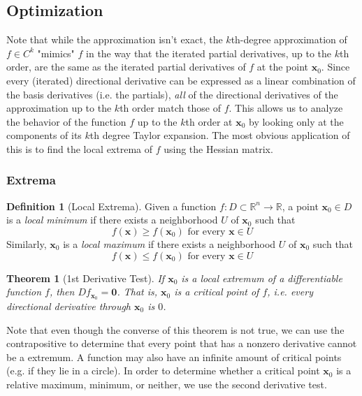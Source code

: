 \documentclass{article}
\newtheorem{theorem}{Theorem}[section]
\theoremstyle{remark}
\theoremstyle{definition}
\newtheorem{definition}{Definition}[section]
\begin{document}
\subsection{Optimization}

Note that while the approximation isn't exact, the $k$th-degree approximation of $f \in C^k$ "mimics" $f$ in the way that the iterated partial derivatives, up to the $k$th order, are the same as the iterated partial derivatives of $f$ at the point $\mathbf{x}_0$. Since every (iterated) directional derivative can be expressed as a linear combination of the basis derivatives (i.e. the partials), \textit{all} of the directional derivatives of the approximation up to the $k$th order match those of $f$. This allows us to analyze the behavior of the function $f$ up to the $k$th order at $\mathbf{x}_0$ by looking only at the components of its $k$th degree Taylor expansion. The most obvious application of this is to find the local extrema of $f$ using the Hessian matrix. 

\subsubsection{Extrema}

\begin{definition}[Local Extrema]
Given a function $f: D \subset \mathbb{R}^n \longrightarrow \mathbb{R}$, a point $\mathbf{x}_0 \in D$ is a \textit{local minimum} if there exists a neighborhood $U$ of $\mathbf{x}_0$ such that 
\[f(\mathbf{x}) \geq f(\mathbf{x}_0) \text{ for every } \mathbf{x} \in U\]
Similarly, $\mathbf{x}_0$ is a \textit{local maximum} if there exists a neighborhood $U$ of $\mathbf{x}_0$ such that 
\[f(\mathbf{x}) \leq f(\mathbf{x}_0) \text{ for every } \mathbf{x} \in U\]
\end{definition}

\begin{theorem}[1st Derivative Test]
If $\mathbf{x}_0$ is a local extremum of a differentiable function $f$, then $D f_{\mathbf{x}_0} = \mathbf{0}$. That is, $\mathbf{x}_0$ is a critical point of $f$, i.e. every directional derivative through $\mathbf{x}_0$ is $0$. 
\end{theorem}

Note that even though the converse of this theorem is not true, we can use the contrapositive to determine that every point that has a nonzero derivative cannot be a extremum. A function may also have an infinite amount of critical points (e.g. if they lie in a circle). In order to determine whether a critical point $\mathbf{x}_0$ is a relative maximum, minimum, or neither, we use the second derivative test. 
\end{document}
